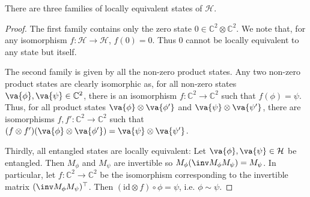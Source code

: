 \documentclass{article}
\begin{document}
\begin{claim*}[c]
  There are three families of locally equivalent states of $\mathcal H$.
  \begin{proof}
    The first family contains only the zero state $0\in\mathbb C^2\otimes\mathbb C^2$.
    We note that, for any isomorphism $f:\mathcal H\to\mathcal H$,
    $f(0)=0$. Thus $0$ cannot be locally equivalent to any state but itself.

    The second family is given by all the non-zero product states. Any two
    non-zero product states are
    clearly isomorphic as, for all non-zero states $\va{\phi},\va{\psi}\in\mathbb C^2$, there is
    an isomorphism $f:\mathbb C^2\to\mathbb C^2$ such that $f(\phi)=\psi$. Thus,
    for all product states $\va{\phi}\otimes\va{\phi'}$ and $\va{\psi}\otimes\va{\psi'}$,
    there are isomorphisms $f,f':\mathbb C^2\to\mathbb C^2$ such that
    $(f\otimes f')(\va{\phi}\otimes\va{\phi'}) = \va{\psi}\otimes\va{\psi'}$.

    Thirdly, all entangled states are locally equivalent: Let $\va{\phi},\va{\psi}\in\mathcal H$
    be entangled. Then $M_\phi$ and $M_\psi$ are invertible so
    $M_\phi (\inv M_\phi M_\psi) = M_\psi$. In particular, let $f:\mathbb C^2\to\mathbb C^2$
    be the isomorphism corresponding to the invertible matrix $(\inv M_\phi M_\psi)^\top$. Then
    $(\text{id}\otimes f)\circ \phi = \psi$, i.e. $\phi\sim\psi$.
  \end{proof}
\end{claim*}
\end{document}
